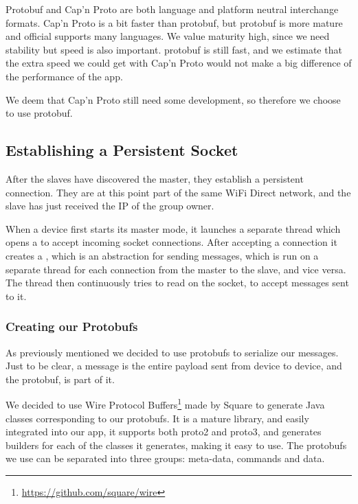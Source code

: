 Protobuf and Cap'n Proto are both language and platform neutral interchange formats.
Cap'n Proto is a bit faster than protobuf, but protobuf is more mature and official supports many languages.
We value maturity high, since we need stability but speed is also important.
protobuf is still fast, and we estimate that the extra speed we could get with Cap'n Proto would not make a big difference of the performance of the app.

We deem that Cap'n Proto still need some development, so therefore we choose to use protobuf.

\subsection{Establishing a Persistent Socket}

After the slaves have discovered the master, they establish a persistent connection.
They are at this point part of the same WiFi Direct network, and the slave has just received the IP of the group owner.

When a device first starts its master mode, it launches a separate thread which opens a  to accept incoming socket connections.
After accepting a connection it creates a , which is an abstraction for sending messages, which is run on a separate thread for each connection from the master to the slave, and vice versa.
The thread then continuously tries to read on the socket, to accept messages sent to it.

\subsubsection*{Creating our Protobufs}
As previously mentioned we decided to use protobufs to serialize our messages.
Just to be clear, a message is the entire payload sent from device to device, and the protobuf, is part of it.

We decided to use Wire Protocol Buffers\footnote{\url{https://github.com/square/wire}} made by Square to generate Java classes corresponding to our protobufs.
It is a mature library, and easily integrated into our app, it supports both proto2 and proto3, and generates builders for each of the classes it generates, making it easy to use.
The protobufs we use can be separated into three groups: meta-data, commands and data.

